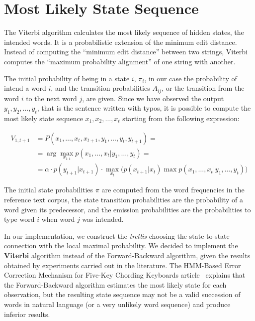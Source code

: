 \section{Most Likely State Sequence}

The Viterbi algorithm calculates the most likely sequence of hidden states, the intended words. It is a probabilistic 
extension of the minimum edit distance. Instead of computing the “minimum edit distance” between two strings, Viterbi 
computes the “maximum probability alignment” of one string with another. 

The initial probability of being in a state $i$, $\pi_i$, in our case the probability of intend a word $i$, and the 
transition probabilities $A_{ij}$, or the transition from the word $i$ to the next word $j$, are given. Since we have 
observed the output $y_1, y_2, \dots , y_t$, that is the sentence written with typos, it is possible to compute the 
most likely state sequence $x_1, x_2, \dots , x_t$ starting from the following expression:

\begin{equation}
\begin{aligned}
V_{1,t+1} &= P(x_1, \dots, x_t, x_{t+1}, y_1, \dots, y_t,  y_{t+1}) = \\
&= \arg\max_{x_{1:t}} p(x_1, \dots, x_t | y_1, \dots, y_t) = \\
& =  \alpha \cdot p(y_{t+1}|x_{t+1})\cdot\max_{x_t} \Big( p(x_{t+1}|x_t) \max p(x_1, \dots, x_{t}|y_1, 
\dots, y_t)\Big)
\end{aligned}
\end{equation}

The initial state probabilities $\pi$ are computed from the word frequencies in the reference text corpus, the state 
transition probabilities are the probability of a word given its predecessor, and the emission probabilities are the 
probabilities to type word $i$ when word $j$ was intended.

In our implementation, we construct the \textit{trellis} choosing the state-to-state connection with the local maximal 
probability. We decided to implement the \textbf{Viterbi} algorithm instead of the Forward-Backward algorithm, given 
the results obtained by experiments carried out in the literature.
The HMM-Based Error Correction Mechanism for Five-Key Chording Keyboards article~\cite{tarniceriu2015hmm} explains that 
the Forward-Backward algorithm estimates the most likely state for each observation, but the resulting state sequence 
may not be a valid succession of words in natural language (or a very unlikely word sequence) and produce inferior 
results.
